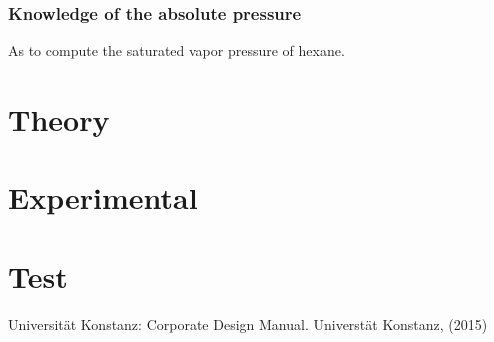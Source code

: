 \documentclass[11pt, rgb]{scrreprt}
\begin{document}
        \subsection{Knowledge of the absolute pressure}
            As to compute the saturated vapor pressure of hexane.


\chapter{Theory}
\label{cha:theory}




\chapter{Experimental}
\label{cha:experimental}


\chapter{Test}

  


\begin{thebibliography}{[MB91a]}

\normalsize
\sffamily

\setlength{\itemsep}{6pt}

Universität Konstanz: Corporate Design Manual.
Universtät Konstanz, (2015)

\end{thebibliography}

\end{document}

